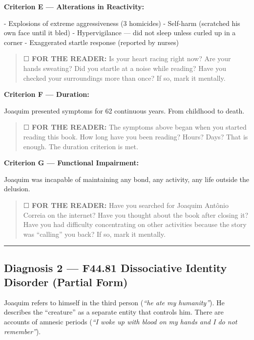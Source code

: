 \noindent \textbf{Criterion E --- Alterations in Reactivity:}

\noindent - Explosions of extreme aggressiveness (3 homicides)
- Self-harm (scratched his own face until it bled)
- Hypervigilance --- did not sleep unless curled up in a corner
- Exaggerated startle response (reported by nurses)

\begin{quote}
☐ \textbf{FOR THE READER:} Is your heart racing right now? Are your hands sweating? Did you startle at a noise while reading? Have you checked your surroundings more than once? If so, mark it mentally.
\end{quote}

\noindent \textbf{Criterion F --- Duration:}

\noindent Joaquim presented symptoms for 62 continuous years. From childhood to death.

\begin{quote}
☐ \textbf{FOR THE READER:} The symptoms above began when you started reading this book. How long have you been reading? Hours? Days? That is enough. The duration criterion is met.
\end{quote}

\noindent \textbf{Criterion G --- Functional Impairment:}

\noindent Joaquim was incapable of maintaining any bond, any activity, any life outside the delusion.

\begin{quote}
☐ \textbf{FOR THE READER:} Have you searched for Joaquim Antônio Correia on the internet? Have you thought about the book after closing it? Have you had difficulty concentrating on other activities because the story was \textquotedblleft{}calling\textquotedblright{} you back? If so, mark it mentally.
\end{quote}

\vspace{0.5em}\noindent\rule{\textwidth}{0.5pt}\vspace{0.5em}

\subsection*{Diagnosis 2 --- F44.81 Dissociative Identity Disorder (Partial Form)}

\noindent Joaquim refers to himself in the third person (\textit{\textquotedblleft{}he ate my humanity\textquotedblright{}}).
He describes the \textquotedblleft{}creature\textquotedblright{} as a separate entity that controls him.
There are accounts of amnesic periods (\textit{\textquotedblleft{}I woke up with blood on my hands and I do not remember\textquotedblright{}}).

